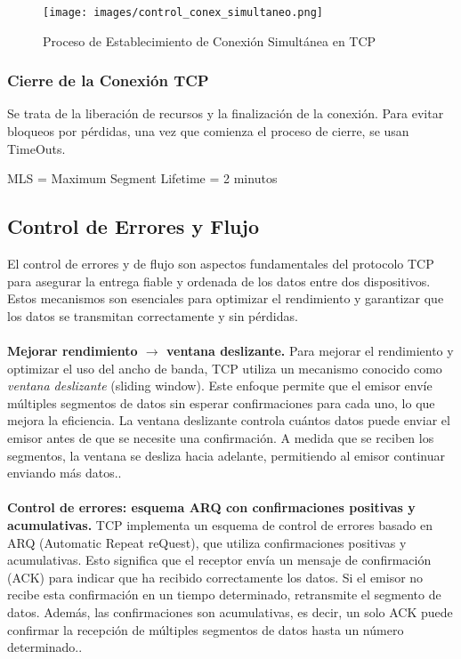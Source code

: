 \documentclass[a4paper,12pt]{article}
\begin{document}
\begin{figure}[H]
    \centering
    \texttt{[image: images/control\_conex\_simultaneo.png]}
    \caption{Proceso de Establecimiento de Conexión Simultánea en TCP}
    \label{fig:tcp_simultaneo}
\end{figure}

\subsubsection{Cierre de la Conexión TCP}

Se trata de la liberación de recursos y la finalización de la conexión. Para evitar bloqueos por pérdidas, una vez que comienza el proceso de cierre, se usan TimeOuts.

\begin{tcolorbox}[colback=red!5!white,colframe=red!75!black]
    MLS  = Maximum Segment Lifetime = 2 minutos
\end{tcolorbox}

\subsection{Control de Errores y Flujo}

El control de errores y de flujo son aspectos fundamentales del protocolo TCP para asegurar la entrega fiable y ordenada de los datos entre dos dispositivos. Estos mecanismos son esenciales para optimizar el rendimiento y garantizar que los datos se transmitan correctamente y sin pérdidas.\\\\
\textbf{Mejorar rendimiento $\rightarrow$ ventana deslizante.}  
Para mejorar el rendimiento y optimizar el uso del ancho de banda, TCP utiliza un mecanismo conocido como \textit{ventana deslizante} (sliding window). Este enfoque permite que el emisor envíe múltiples segmentos de datos sin esperar confirmaciones para cada uno, lo que mejora la eficiencia. La ventana deslizante controla cuántos datos puede enviar el emisor antes de que se necesite una confirmación. A medida que se reciben los segmentos, la ventana se desliza hacia adelante, permitiendo al emisor continuar enviando más datos..\\\\

\textbf{Control de errores: esquema ARQ con confirmaciones positivas y acumulativas.}  
TCP implementa un esquema de control de errores basado en ARQ (Automatic Repeat reQuest), que utiliza confirmaciones positivas y acumulativas. Esto significa que el receptor envía un mensaje de confirmación (ACK) para indicar que ha recibido correctamente los datos. Si el emisor no recibe esta confirmación en un tiempo determinado, retransmite el segmento de datos. Además, las confirmaciones son acumulativas, es decir, un solo ACK puede confirmar la recepción de múltiples segmentos de datos hasta un número determinado..\\\\
\end{document}
